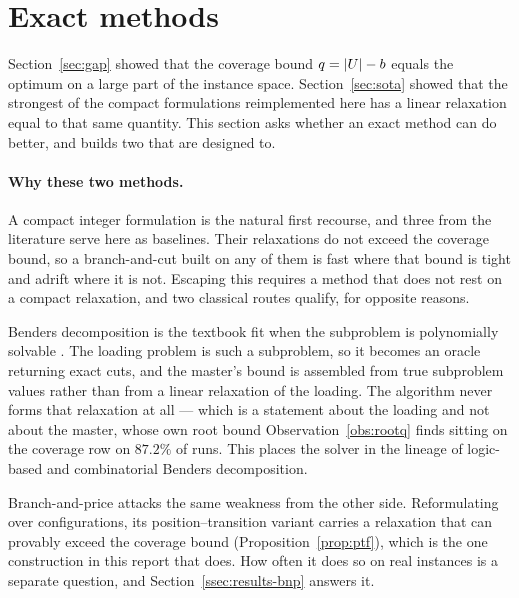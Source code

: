 \section{Exact methods}\label{sec:exact}

Section~\ref{sec:gap} showed that the coverage bound $q=\lvert U\rvert-b$ equals the
optimum on a large part of the instance space. Section~\ref{sec:sota} showed that the
strongest of the compact formulations reimplemented here has a linear relaxation equal to that
same quantity. This section asks whether an exact method can do better, and builds
two that are designed to.

\paragraph{Why these two methods.}
A compact integer formulation is the natural first recourse, and three from the
literature serve here as baselines. Their relaxations do not exceed the coverage
bound, so a branch-and-cut built on any of them is fast where that bound is tight and
adrift where it is not. Escaping this requires a method that does not rest on a
compact relaxation, and two classical routes qualify, for opposite reasons.

Benders decomposition is the textbook fit when the subproblem is polynomially
solvable \citep{Rahmaniani2017}. The loading problem is such a subproblem, so it
becomes an oracle returning exact cuts, and the master's bound is assembled from true
subproblem values rather than from a linear relaxation of the loading. The algorithm
never forms that relaxation at all --- which is a statement about the loading and not
about the master, whose own root bound Observation~\ref{obs:rootq} finds sitting on the
coverage row on $87.2\%$ of runs. This places the solver in the lineage of logic-based
\citep{Hooker2003} and combinatorial \citep{Codato2006} Benders decomposition.

Branch-and-price attacks the same weakness from the other side. Reformulating over
configurations, its position--transition variant carries a relaxation that can provably
exceed the coverage bound (Proposition~\ref{prop:ptf}), which is the one construction in
this report that does. How often it does so on real instances is a separate question,
and Section~\ref{ssec:results-bnp} answers it.

